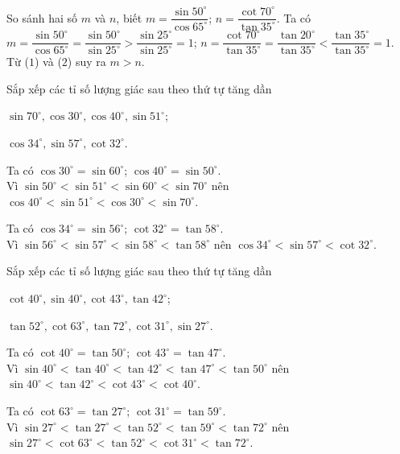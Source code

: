 \begin{vd}%
	So sánh hai số $m$ và $n$, biết $m = \dfrac{\sin 50^\circ}{\cos 65^\circ}$; $n = \dfrac{\cot 70^\circ}{\tan 35^\circ}$.
	\loigiai
	{
	Ta có $m=\dfrac{\sin 50^{\circ}}{\cos 65^{\circ}}=\dfrac{\sin 50^{\circ}}{\sin 25^{\circ}}>\dfrac{\sin 25^{\circ}}{\sin 25^{\circ}}= 1$; 
	\hspace{0.5cm}$n = \dfrac{\cot 70^{\circ}}{\tan 35^{\circ}}=\dfrac{\tan 20^{\circ}}{\tan 35^{\circ}} < \dfrac{\tan 35^{\circ}}{\tan 35^{\circ}}= 1$. 
	Từ ($1$) và ($2$) suy ra $m > n$.
	}
\end{vd}
\begin{vd}%
	Sắp xếp các tỉ số lượng giác sau theo thứ tự tăng dần
	\begin{enumEX}{2}
	\item $\sin 70^{\circ},\cos 30^{\circ},\cos 40^{\circ},\sin 51^{\circ}$;
	\item $\cos 34^{\circ},\sin 57^{\circ},\cot 32^{\circ}$.
	\end{enumEX}
	\loigiai
	{
	\begin{listEX}
	\item Ta có $\cos 30^{\circ}=\sin 60^{\circ}$; $\cos 40^{\circ}=\sin 50^{\circ}$.\\
	Vì $\sin 50^{\circ}<\sin 51^{\circ}<\sin 60^{\circ}<\sin 70^{\circ}$ nên $\cos 40^{\circ}<\sin 51^{\circ}<\cos 30^{\circ}<\sin 70^{\circ}$.
	\item Ta có $\cos 34^{\circ}=\sin 56^{\circ}$; $\cot 32^{\circ} = \tan 58^{\circ}$.\\
	Vì $\sin 56^{\circ} < \sin 57^{\circ} < \sin 58^{\circ} < \tan 58^{\circ}$ nên $\cos 34^{\circ} < \sin 57^{\circ} < \cot 32^{\circ}$.
	\end{listEX}
	}
\end{vd}
\begin{vd}%
	Sắp xếp các tỉ số lượng giác sau theo thứ tự tăng dần
	\begin{enumEX}{2}
	\item $\cot40^{\circ},\sin 40^{\circ},\cot43^{\circ},\tan42^{\circ}$;
	\item $\tan52^{\circ},\cot63^{\circ},\tan72^{\circ},\cot31^{\circ},\sin 27^{\circ}$.
	\end{enumEX}
	\loigiai
	{
	\begin{listEX}
	\item Ta có $\cot40^{\circ}=\tan50^{\circ}$; $\cot43^{\circ}=\tan47^{\circ}$.\\
	Vì $\sin 40^{\circ}<\tan40^{\circ}<\tan42^{\circ}<\tan47^{\circ}<\tan50^{\circ}$ nên $\sin 40^{\circ}<\tan42^{\circ}<\cot43^{\circ}<\cot40^{\circ}$.
	\item Ta có $\cot63^{\circ}=\tan27^{\circ}$; $\cot31^{\circ}=\tan59^{\circ}$.\\
	Vì $\sin 27^{\circ}<\tan27^{\circ}<\tan52^{\circ}<\tan59^{\circ}<\tan72^{\circ}$ nên $\sin 27^{\circ}<\cot63^{\circ}<\tan52^{\circ}<\cot31^{\circ}<\tan72^{\circ}$.
	\end{listEX}
	}
\end{vd}
